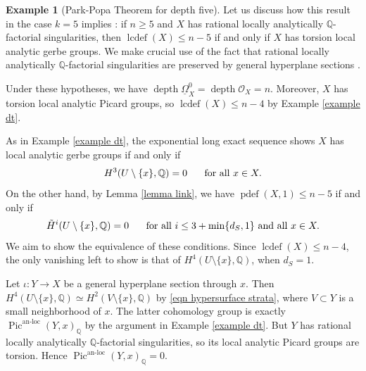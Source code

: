 \documentclass[11pt]{amsart}
\theoremstyle{definition}
\newtheorem{example}[equation]{Example}
\theoremstyle{plain}
\DeclareMathOperator{\Pic}{Pic}
\DeclareMathOperator{\lcdef}{lcdef}
\DeclareMathOperator{\pdef}{pdef}
\DeclareMathOperator{\depth}{depth}
\DeclareMathOperator{\anloc}{an-loc}
\begin{document}
\begin{example}[Park-Popa Theorem for depth five]\label{exmp lcdef 5}
Let us discuss how this result in the case $k=5$ implies \cite[Corollary G]{popa park lefschetz}: if $n \geq 5$ and $X$ has rational locally analytically $\mathbb{Q}$-factorial singularities, then $\lcdef(X) \leq n-5$ if and only if $X$ has torsion local analytic gerbe groups. We make crucial use of the fact that rational locally analytically $\mathbb{Q}$-factorial singularities are preserved by general hyperplane sections \cite[Proposition $12.1$]{popa park lefschetz}.

Under these hypotheses, we have $\depth \underline{\Omega}_X^0 = \depth \mathscr{O}_X = n$. Moreover, $X$ has torsion local analytic Picard groups, so $\lcdef(X) \leq n-4$ by Example \ref{example dt}.

As in Example \ref{example dt}, the exponential long exact sequence shows $X$ has local analytic gerbe groups if and only if
\begin{align*}
    H^3(U \setminus \{ x\}, \mathbb{Q}) = 0 \hspace{.5cm} \text{ for all } x \in X.
\end{align*}
On the other hand, by Lemma \ref{lemma link}, we have $\pdef(X,1) \leq n-5$ if and only if
\begin{align}
    \Tilde{H}^i(U \setminus \{ x\}, \mathbb{Q}) = 0 \hspace{.5cm} \text{ for all } i \leq 3+\min \{ d_S, 1\} \text{ and all } x \in X.
\end{align}
We aim to show the equivalence of these conditions. Since $\lcdef(X) \leq n-4$, the only vanishing left to show is that of $H^4(U \setminus \{ x \}, \mathbb{Q})$, when $d_S = 1$. 

Let $\iota: Y \rightarrow X$ be a general hyperplane section through $x$. Then $H^4(U \setminus \{ x \}, \mathbb{Q}) \simeq H^2(V \setminus \{ x \}, \mathbb{Q})$ by \ref{eqn hypersurface strata}, where $V \subset Y$ is a small neighborhood of $x$. The latter cohomology group is exactly $\Pic^{\anloc}(Y,x)_\mathbb{Q}$ by the argument in Example \ref{example dt}. But $Y$ has rational locally analytically $\mathbb{Q}$-factorial singularities, so its local analytic Picard groups are torsion. Hence $\Pic^{\anloc}(Y,x)_\mathbb{Q} = 0$.
\end{example}
\end{document}
